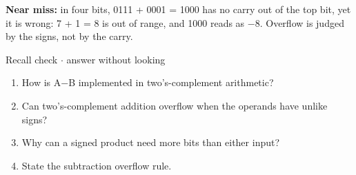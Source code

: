 \documentclass[11pt]{article}
\begin{document}
\begin{keepsection}
\begin{keepsection}
\begin{notebox}\textbf{Near miss:} in four bits, 0111 + 0001 = 1000 has no carry out of the top bit, yet it is wrong: 7 + 1 = 8 is out of range, and 1000 reads as \ensuremath{-}8. Overflow is judged by the signs, not by the carry.\end{notebox}

\begin{recallbox}{Recall check \ensuremath{\cdot} answer without looking}
\begin{enumerate}
\item How is A\ensuremath{-}B implemented in two’s-complement arithmetic?
\item Can two’s-complement addition overflow when the operands have unlike signs?
\item Why can a signed product need more bits than either input?
\item State the subtraction overflow rule.
\end{enumerate}

\end{recallbox}
\end{keepsection}
\end{keepsection}
\end{document}
